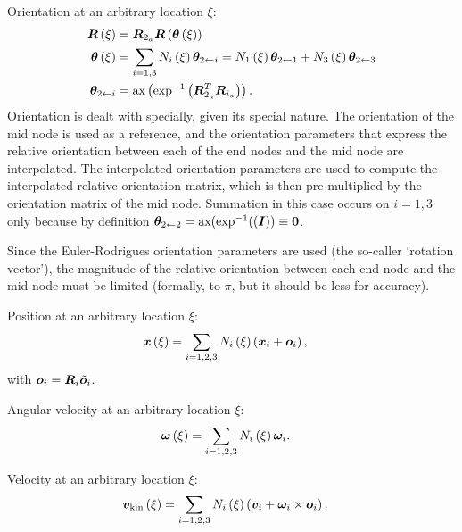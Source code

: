 Orientation at an arbitrary location $\xi$:
\begin{align}
	\bm{R}\left( \xi \right)
	&=
	\bm{R}_{2_a} \bm{R}\left( \bm{\theta}\left( \xi \right) \right)
	\\
	\bm{\theta}\left( \xi \right)
	&=
	\sum_{i=1,3} N_i\left( \xi \right) \bm{\theta}_{2\leftarrow i}
	= N_1\left( \xi \right) \bm{\theta}_{2\leftarrow 1} + N_3\left( \xi \right) \bm{\theta}_{2\leftarrow 3}
	\\
	\bm{\theta}_{2\leftarrow i}
	&=
	\text{ax}\left( \text{exp}^{-1}\left( \bm{R}_{2_a}^T \bm{R}_{i_a} \right) \right)
	.
\end{align}
Orientation is dealt with specially, given its special nature.
The orientation of the mid node is used as a reference,
and the orientation parameters that express the relative orientation
between each of the end nodes and the mid node are interpolated.
The interpolated orientation parameters are used to compute
the interpolated relative orientation matrix, which is then
pre-multiplied by the orientation matrix of the mid node.
Summation in this case occurs on $i=1,3$ only because by definition
$\bm{\theta}_{2\leftarrow 2}=\text{ax}(\text{exp}^{-1}((\bm{I}))\equiv\bm{0}$.

Since the Euler-Rodrigues orientation parameters are used
(the so-caller `rotation vector'),
the magnitude of the relative orientation between each end node
and the mid node must be limited (formally, to $\pi$,
but it should be less for accuracy).

Position at an arbitrary location $\xi$:
\begin{align}
	\bm{x}\left( \xi \right)
	&=
	\sum_{i=1,2,3} N_i\left( \xi \right) \left( 
		\bm{x}_i + \bm{o}_i
	 \right)
	,
\end{align}
with $\bm{o}_i=\bm{R}_i \tilde{\bm{o}}_i$.

Angular velocity at an arbitrary location $\xi$:
\begin{align}
	\bm{\omega}\left( \xi \right)
	&=
	\sum_{i=1,2,3} N_i\left( \xi \right) \bm{\omega}_i
	.
\end{align}

Velocity at an arbitrary location $\xi$:
\begin{align}
	\bm{v}_{\text{kin}}\left( \xi \right)
	&=
	\sum_{i=1,2,3} N_i\left( \xi \right) \left( 
		\bm{v}_i
		+ \bm{\omega}_i \times \bm{o}_i
	 \right)
	.
\end{align}

